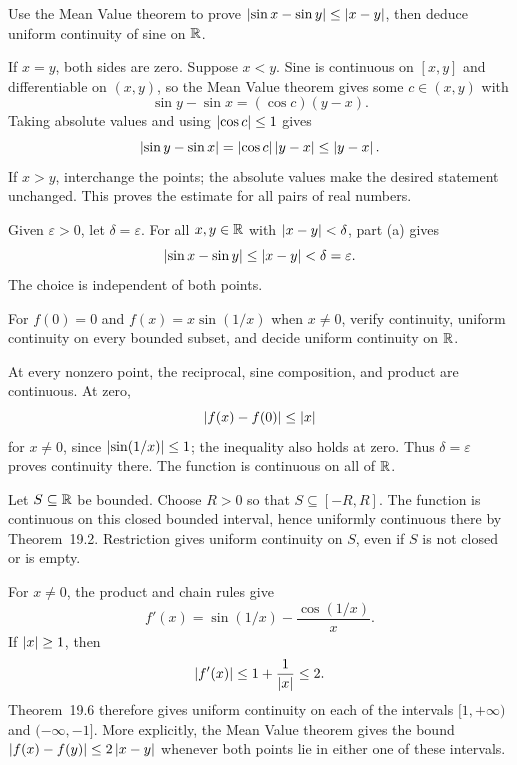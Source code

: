 \goal Use the Mean Value theorem to prove
$\left|\sin x-\sin y\right|\le\left|x-y\right|$, then deduce uniform
continuity of sine on $\mathbb{R}$.

If $x=y$, both sides are zero. Suppose $x<y$. Sine is
continuous on $[x,y]$ and differentiable on $(x,y)$, so the
Mean Value theorem gives some $c\in(x,y)$ with
\[
 \sin y-\sin x=(\cos c)(y-x).
\]
Taking absolute values and using $\left|\cos c\right|\le1$ gives
\[
 \left|\sin y-\sin x\right|
 =\left|\cos c\right|\left|y-x\right|\le\left|y-x\right|.
\]
If $x>y$, interchange the points; the absolute values make
the desired statement unchanged. This proves the estimate for
all pairs of real numbers.

Given $\varepsilon>0$, let $\delta=\varepsilon$.
For all $x,y\in\mathbb{R}$ with $\left|x-y\right|<\delta$, part (a) gives
\[
 \left|\sin x-\sin y\right|\le\left|x-y\right|<\delta=\varepsilon.
\]
The choice is independent of both points.

\goal For $f(0)=0$ and $f(x)=x\sin(1/x)$ when $x\ne0$,
verify continuity, uniform continuity on every bounded subset,
and decide uniform continuity on $\mathbb{R}$.

At every nonzero point, the reciprocal, sine composition,
and product are continuous. At zero,
\[
 \left|f(x)-f(0)\right|\le\left|x\right|
\]
for $x\ne0$, since $\left|\sin(1/x)\right|\le1$; the inequality
also holds at zero. Thus $\delta=\varepsilon$ proves continuity
there. The function is continuous on all of $\mathbb{R}$.

Let $S\subseteq\mathbb{R}$ be bounded. Choose $R>0$ so that
$S\subseteq[-R,R]$. The function is continuous on this
closed bounded interval, hence uniformly continuous there by
Theorem~19.2. Restriction gives uniform continuity on $S$,
even if $S$ is not closed or is empty.

For $x\ne0$, the product and chain rules give
\[
 f'(x)=\sin(1/x)-\frac{\cos(1/x)}{x}.
\]
If $\left|x\right|\ge1$, then
\[
 \left|f'(x)\right|\le1+\frac1{\left|x\right|}\le2.
\]
Theorem~19.6 therefore gives uniform continuity on each of the
intervals $[1,+\infty)$ and $(-\infty,-1]$. More explicitly,
the Mean Value theorem gives the bound
$\left|f(x)-f(y)\right|\le2\left|x-y\right|$ whenever both points lie
in either one of these intervals.

